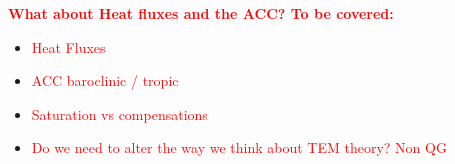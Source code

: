 \textcolor{red}{\textbf{What about Heat fluxes and the ACC? To be covered:}}
\begin{itemize}
\item[]\textcolor{red}{Heat Fluxes}
\item[]\textcolor{red}{ACC baroclinic / tropic}
\item[]\textcolor{red}{Saturation vs compensations}
\item[]\textcolor{red}{Do we need to alter the way we think about TEM theory? Non QG}
\end{itemize}
